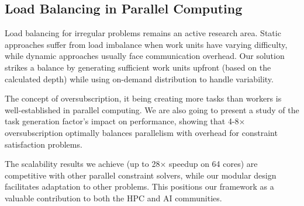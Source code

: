 \subsection{Load Balancing in Parallel Computing}
\label{subsec:load_balancing_in_parallel_computing}
Load balancing for irregular problems remains an active research area. Static approaches suffer from load imbalance when work units have varying difficulty, while dynamic approaches usually face communication overhead. Our solution strikes a balance by generating sufficient work units upfront (based on the calculated depth) while using on-demand distribution to handle variability.

The concept of oversubscription, it being creating more tasks than workers is well-established in parallel computing. We are also going to present a study of the task generation factor's impact on performance, showing that 4-8× oversubscription optimally balances parallelism with overhead for constraint satisfaction problems.


The scalability results we achieve (up to 28× speedup on 64 cores) are competitive with other parallel constraint solvers, while our modular design facilitates adaptation to other problems. This positions our framework as a valuable contribution to both the HPC and AI communities.